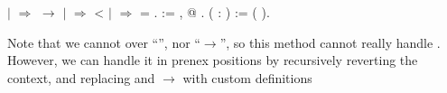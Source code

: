 \begin{coqdoccode}
\coqdocindent{3.50em}
\ensuremath{|}    \ensuremath{\Rightarrow}   \ensuremath{\rightarrow}  \coqdoceol
\coqdocindent{3.50em}
\ensuremath{|}    \ensuremath{\Rightarrow}   <  \coqdoceol
\coqdocindent{3.50em}
\ensuremath{|}    \ensuremath{\Rightarrow}   =  \coqdoceol
\coqdocindent{3.50em}
.\coqdoceol
\coqdocemptyline
\coqdocindent{1.00em}
  := \coqdockw{\ensuremath{\forall}} , @ .\coqdoceol
\coqdocindent{1.00em}
  ( : ) :=  ( ).\coqdoceol
\coqdocemptyline
\end{coqdoccode}
Note that we cannot  over ``\coqdockw{\ensuremath{\forall}}'', nor ``\ensuremath{\rightarrow}'',
      so this method cannot really handle \coqdockw{\ensuremath{\forall}}.  However, we can
      handle it in prenex positions by recursively reverting the
      context, and replacing \coqdockw{\ensuremath{\forall}} and \ensuremath{\rightarrow} with custom definitions
